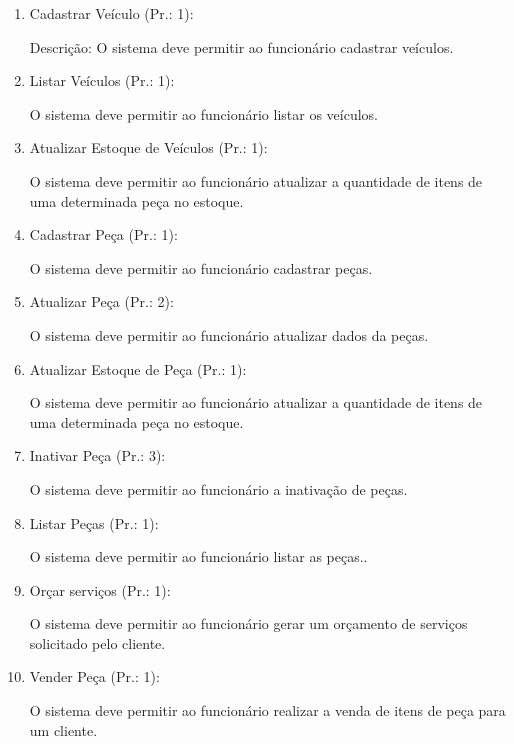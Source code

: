 \begin{enumerate}[
	label=RF\arabic{*}, 
	ref=(RF\arabic{*}),
	leftmargin=1.5em,
	itemindent=4.5em]
\item Cadastrar Veículo (Pr.: 1):\par
Descrição: O sistema deve permitir ao funcionário cadastrar veículos.\par

\item Listar Veículos (Pr.: 1):\par
O sistema deve permitir ao funcionário listar os veículos.\par

\item Atualizar Estoque de Veículos (Pr.: 1):\par
O sistema deve permitir ao funcionário atualizar a quantidade de itens de uma determinada peça no estoque.\par

\item Cadastrar Peça (Pr.: 1):\par
O sistema deve permitir ao funcionário cadastrar  peças.\par

\item Atualizar Peça (Pr.: 2):\par
O sistema deve permitir ao funcionário atualizar dados da peças.\par

\item  Atualizar Estoque de Peça (Pr.: 1):\par
O sistema deve permitir ao funcionário atualizar a quantidade de itens de uma determinada peça no estoque.\par

\item  Inativar Peça (Pr.: 3):\par
O sistema deve permitir ao funcionário a inativação de peças.\par

\item  Listar Peças (Pr.: 1):\par
O sistema deve permitir ao funcionário listar as peças..\par

\item Orçar serviços (Pr.: 1):\par
O sistema deve permitir ao funcionário gerar um orçamento de serviços solicitado  pelo cliente.\par

\item Vender Peça (Pr.: 1):\par
O sistema deve permitir ao funcionário realizar a venda de  itens de peça para um cliente.\par


\end{enumerate}
